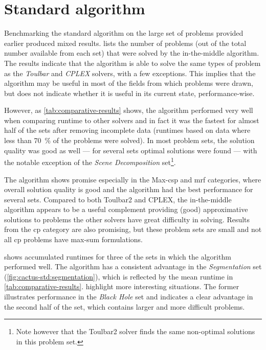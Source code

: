 \section{Standard algorithm}
Benchmarking the standard algorithm on the large set of problems provided earlier produced mixed results.
 lists the number of problems (out of the total number available from each set) that were solved by the in-the-middle algorithm.
The results indicate that the algorithm is able to solve the same types of problem as the \emph{Toulbar} and \emph{CPLEX} solvers, with a few exceptions.
This implies that the algorithm may be useful in most of the fields from which problems were drawn, but does not indicate whether it is useful in its current state, performance-wise.

However, as \cref{tab:comparative-results} shows, the algorithm performed very well when comparing runtime to other solvers and in fact it was the fastest for almost half of the sets after removing incomplete data (runtimes based on data where less than \SI{70}{\percent} of the problems were solved).
In most problem sets, the solution quality was good as well --- for several sets optimal solutions were found --- with the notable exception of the \emph{Scene Decomposition} set\footnote{Note however that the Toulbar2 solver finds the same non-optimal solutions in this problem set.}.

The algorithm shows promise especially in the Max-\gls{csp} and \gls{mrf} categories, where overall solution quality is good and the algorithm had the best performance for several sets.
Compared to both Toulbar2 and CPLEX, the in-the-middle algorithm appears to be a useful complement providing (good) approximative solutions to problems the other solvers have great difficulty in solving.
Results from the \gls{cp} category are also promising, but these problem sets are small and not all \gls{cp} problems have max-sum formulations.

 shows accumulated runtimes for three of the sets in which the algorithm performed well.
The algorithm has a consistent advantage in the \emph{Segmentation} set (\cref{fig:cactus-std:segmentation}), which is reflected by the mean runtime in \cref{tab:comparative-results}.
 highlight more interesting situations.
The former illustrates performance in the \emph{Black Hole} set and indicates a clear advantage in the second half of the set, which contains larger and more difficult problems.

